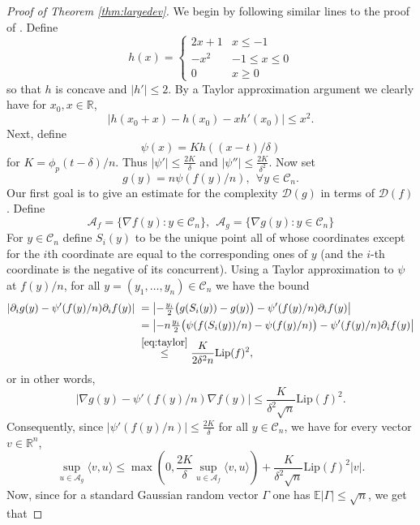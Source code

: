 \documentclass[12pt]{article}
\def \RR {\mathbb R}
\def \EE {\mathbb E}
\def \Lip {\mathrm {Lip}}
\def \DC {\mathcal{C}_n}
\def \Comp { \mathcal{D} }
\theoremstyle{definition}
\theoremstyle{remark}
\begin{document}
\begin{proof} [Proof of Theorem \ref{thm:largedev}]
	We begin by following similar lines to the proof of \cite[Theorem 1.1]{CD14}. Define
	$$
	h(x) = \begin{cases}
	2x + 1 &  x \leq -1 \\
	- x^2 & -1 \leq x \leq 0 \\
	0 & x \geq 0
	\end{cases}
	$$
	so that $h$ is concave and $|h'| \leq 2$. By a Taylor approximation argument we clearly have for $x_0, x \in \RR$,
	\begin{equation}\label{eq:taylor}
	\left |h(x_0+ x) - h(x_0) - x h'(x_0) \right | \leq x^2.
	\end{equation}
	Next, define
	$$
	\psi(x) = K h((x-t)/\delta)
	$$
	for $K = \phi_p(t-\delta) / n$. Thus $|\psi'| \leq \frac{2K}{\delta}$ and $|\psi''| \leq \frac{2 K}{\delta^2}$. 
	Now set
	$$
	g(y) = n \psi(f(y)/n), ~~ \forall y \in \DC.
	$$
	Our first goal is to give an estimate for the complexity $\Comp(g)$ in terms of $\Comp(f)$. Define
	$$
	\mathcal{A}_f = \{\nabla f(y): y \in \DC\}, ~~ \mathcal{A}_g = \{\nabla g(y): y \in \DC\}
	$$
	For $y \in \DC$ define $S_i(y)$ to be the unique point all of whose coordinates except for the $i$th coordinate are equal to the corresponding ones of $y$ (and the $i$-th coordinate is the negative of its concurrent). Using a Taylor approximation to $\psi$ at $f(y)/n$, for all $y=(y_1,\dots,y_n) \in \DC$ we have the bound
	\begin{align*}
	\left | \partial_i g(y) - \psi'(f(y)/n) \partial_i f(y) \right |  ~& =  \left | - \tfrac{y_i}{2} \bigl( g(S_i(y))-g(y) \bigr ) - \psi'(f(y)/n) \partial_i f(y) \right | \\
	& = \left | -n \tfrac{y_i}{2} \bigl(\psi(f(S_i(y)) / n) - \psi(f(y) / n) \bigr) - \psi'(f(y)/n) \partial_i f(y) \right | \\
	& \stackrel{\eqref{eq:taylor}}{\leq} \frac{K}{2 \delta^2 n } \Lip(f)^2,
	\end{align*}
	or in other words,
	$$
	\left | \nabla g(y) - \psi'(f(y)/n) \nabla f(y) \right | \leq \frac{K}{\delta^2 \sqrt{n}} \Lip(f)^2.
	$$
	Consequently, since $|\psi'(f(y)/n)| \leq \frac{2K}{\delta}$ for all $y \in \DC$, we have for every vector $v \in \RR^n$,
	$$
	\sup_{u \in \mathcal{A}_g} \langle v,u \rangle \leq \max \left (0, \frac{2K}{\delta} \sup_{u \in \mathcal{A}_f} \langle v,u \rangle \right ) + \frac{K}{\delta^2 \sqrt{n}} \Lip(f)^2 |v|.
	$$
	Now, since for a standard Gaussian random vector $\Gamma$ one has $\EE|\Gamma| \leq \sqrt{n}$, we get that

\end{proof}
\end{document}
